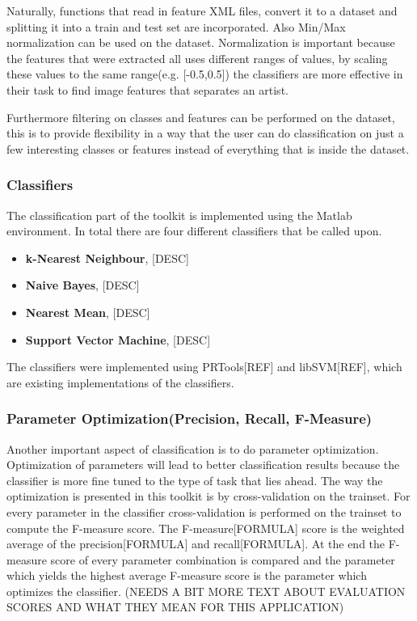 Naturally, functions that read in feature XML files, convert it to a dataset and splitting it into a train and test set are incorporated.
Also Min/Max normalization can be used on the dataset.
Normalization is important because the features that were extracted all uses different ranges of values, by scaling these values to the same range(e.g. [-0.5,0.5]) the classifiers are more effective in their task to find image features that separates an artist.

Furthermore filtering on classes and features can be performed on the dataset, this is to provide flexibility in a way that the user can do classification on just a few interesting classes or features instead of everything that is inside the dataset.

\subsubsection{Classifiers}
The classification part of the toolkit is implemented using the Matlab environment. In total there are four different classifiers that be called upon.

\begin{itemize}
	\item \textbf{k-Nearest Neighbour}, [DESC]
	\item \textbf{Naive Bayes}, [DESC]
	\item \textbf{Nearest Mean}, [DESC]
	\item \textbf{Support Vector Machine}, [DESC]
\end{itemize}

The classifiers were implemented using PRTools[REF] and libSVM[REF], which are existing implementations of the classifiers.

\subsubsection{Parameter Optimization(Precision, Recall, F-Measure)}
Another important aspect of classification is to do parameter optimization. 
Optimization of parameters will lead to better classification results because the classifier is more fine tuned to the type of task that lies ahead. 
The way the optimization is presented in this toolkit is by cross-validation on the trainset.
For every parameter in the classifier cross-validation is performed on the trainset to compute the F-measure score.
The F-measure[FORMULA] score is the weighted average of the precision[FORMULA] and recall[FORMULA].
At the end the F-measure score of every parameter combination is compared and the parameter which yields the highest average F-measure score is the parameter which optimizes the classifier.
(NEEDS A BIT MORE TEXT ABOUT EVALUATION SCORES AND WHAT THEY MEAN FOR THIS APPLICATION)

